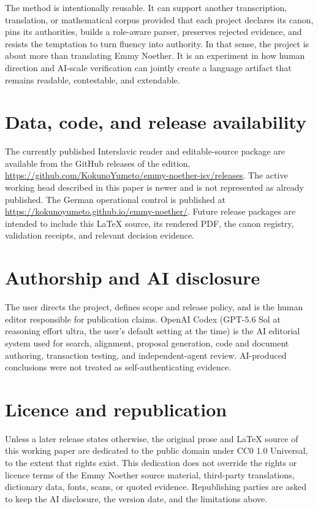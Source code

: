 \documentclass[11pt,a4paper]{article}
\begin{document}
The method is intentionally reusable. It can support another transcription, translation, or mathematical corpus provided that each project declares its canon, pins its authorities, builds a role-aware parser, preserves rejected evidence, and resists the temptation to turn fluency into authority. In that sense, the project is about more than translating Emmy Noether. It is an experiment in how human direction and AI-scale verification can jointly create a language artifact that remains readable, contestable, and extendable.

\section*{Data, code, and release availability}

The currently published Interslavic reader and editable-source package are available from the GitHub releases of the edition, \url{https://github.com/KokunoYumeto/emmy-noether-isv/releases}. The active working head described in this paper is newer and is not represented as already published. The German operational control is published at \url{https://kokunoyumeto.github.io/emmy-noether/}. Future release packages are intended to include this \LaTeX{} source, its rendered PDF, the canon registry, validation receipts, and relevant decision evidence.

\section*{Authorship and AI disclosure}

The user directs the project, defines scope and release policy, and is the human editor responsible for publication claims. OpenAI Codex (GPT-5.6 Sol at reasoning effort ultra, the user's default setting at the time) is the AI editorial system used for search, alignment, proposal generation, code and document authoring, transaction testing, and independent-agent review. AI-produced conclusions were not treated as self-authenticating evidence.

\section*{Licence and republication}

Unless a later release states otherwise, the original prose and \LaTeX{} source of this working paper are dedicated to the public domain under CC0 1.0 Universal, to the extent that rights exist. This dedication does not override the rights or licence terms of the Emmy Noether source material, third-party translations, dictionary data, fonts, scans, or quoted evidence. Republishing parties are asked to keep the AI disclosure, the version date, and the limitations above.
\end{document}
